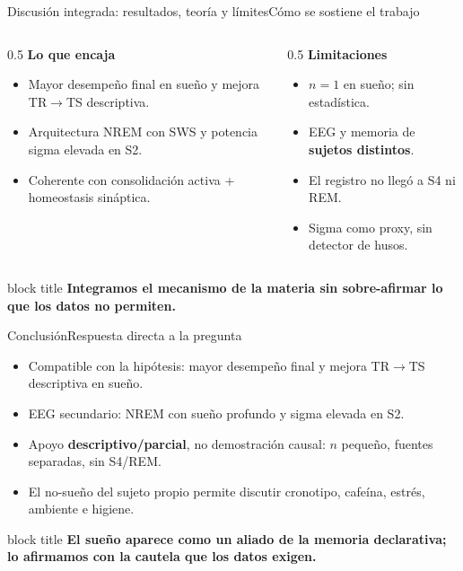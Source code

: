 \documentclass[aspectratio=169,11pt,t]{beamer}
\newcommand{\claim}[1]{%
  \begin{beamercolorbox}[wd=\textwidth,sep=7pt,rounded=true,shadow=false]{block title}%
    \centering\bfseries #1%
  \end{beamercolorbox}}
\begin{document}
\begin{frame}{Discusión integrada: resultados, teoría y límites}{Cómo se sostiene el trabajo}
  \begin{columns}[T,onlytextwidth]
    \begin{column}{0.5\textwidth}
      \textbf{\color{navy}Lo que encaja}
      \begin{itemize}\setlength\itemsep{2pt}
        \item Mayor desempeño final en sueño y mejora TR$\to$TS descriptiva.
        \item Arquitectura NREM con SWS y potencia sigma elevada en S2.
        \item Coherente con consolidación activa + homeostasis sináptica.
      \end{itemize}
    \end{column}
    \begin{column}{0.5\textwidth}
      \textbf{\color{warn}Limitaciones}
      \begin{itemize}\setlength\itemsep{2pt}
        \item $n=1$ en sueño; sin estadística.
        \item EEG y memoria de \textbf{sujetos distintos}.
        \item El registro no llegó a S4 ni REM.
        \item Sigma como proxy, sin detector de husos.
      \end{itemize}
    \end{column}
  \end{columns}
  \vskip5pt
  \claim{Integramos el mecanismo de la materia sin sobre-afirmar lo que los datos no permiten.}
\end{frame}

\begin{frame}{Conclusión}{Respuesta directa a la pregunta}
  \begin{itemize}\setlength\itemsep{3pt}
    \item Compatible con la hipótesis: mayor desempeño final y mejora TR$\to$TS descriptiva en sueño.
    \item EEG secundario: NREM con sueño profundo y sigma elevada en S2.
    \item Apoyo \textbf{descriptivo/parcial}, no demostración causal: $n$ pequeño, fuentes separadas, sin S4/REM.
    \item El no-sueño del sujeto propio permite discutir cronotipo, cafeína, estrés, ambiente e higiene.
  \end{itemize}
  \vskip6pt
  \claim{El sueño aparece como un aliado de la memoria declarativa; lo afirmamos con la cautela que los datos exigen.}
\end{frame}
\end{document}
